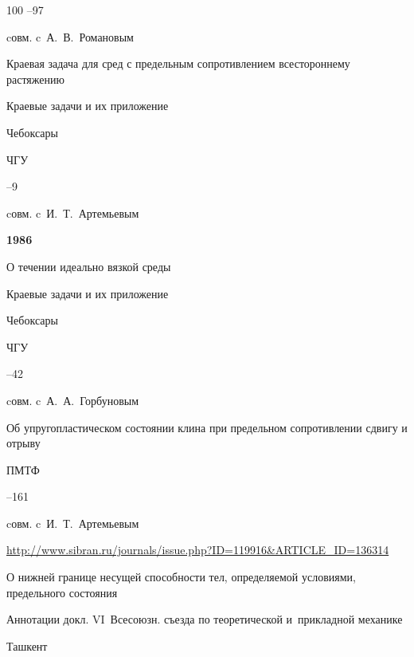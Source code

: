 \begin{thebibliography}{100}
–97 

\miscnote cовм. c~А.~В.~Романовым










\paper Краевая задача для сред с предельным сопротивлением всестороннему растяжению 

\inbook Краевые задачи и их приложение

\publaddr Чебоксары

\publ ЧГУ


–9 

\miscnote cовм. c~И.~Т.~Артемьевым





\item[] \centerline{\bf 1986}




\paper О течении идеально вязкой среды 

\inbook Краевые задачи и их приложение

\publaddr Чебоксары

\publ ЧГУ


–42 

\miscnote cовм. c~А.~А.~Горбуновым




\paper Об упругопластическом состоянии клина при предельном сопротивлении сдвигу	 и отрыву 

\jour ПМТФ 



–161 

\miscnote cовм. c~И.~Т.~Артемьевым

\elink \url{http://www.sibran.ru/journals/issue.php?ID=119916&ARTICLE_ID=136314}




\paper О нижней границе несущей способности тел, определяемой условиями, предельного состояния

\inbook Аннотации докл. VI~Всесоюзн. съезда по теоретической и~прикладной механике

\publaddr Ташкент


\end{thebibliography}
